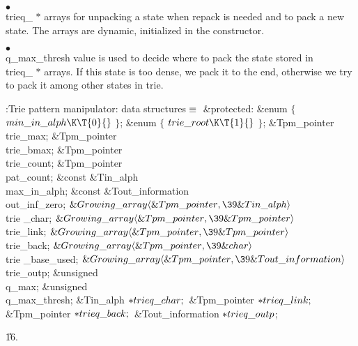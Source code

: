 \item{$\bullet$} \\{trieq\_} $*$ arrays for unpacking a state when repack is
needed and to pack a new state. The arrays are dynamic, initialized in
the constructor.

\item{$\bullet$} \\{q\_max\_thresh} value is used to decide where to pack the
state stored in \\{trieq\_} $*$ arrays. If this state is too dense, we pack it
to the end, otherwise we try to pack it among other states in trie.

\Y\B\4:Trie pattern manipulator: data structures\X${}\equiv{}$\6
\4\&{protected}:\6
\&{enum} ${}\{{}$\1\6
${}\\{min\_in\_alph}\K\T{0}{}$\2\6
${}\}{}$;\6
\&{enum} ${}\{{}$\1\6
${}\\{trie\_root}\K\T{1}{}$\2\6
${}\}{}$;\6
\&{Tpm\_pointer} \\{trie\_max};\6
\&{Tpm\_pointer} \\{trie\_bmax};\6
\&{Tpm\_pointer} \\{trie\_count};\6
\&{Tpm\_pointer} \\{pat\_count};\7
\&{const} \&{Tin\_alph} \\{max\_in\_alph};\6
\&{const} \&{Tout\_information} \\{out\_inf\_zero};\7
${}\&{Growing\_array}\langle\&{Tpm\_pointer},\39\&{Tin\_alph}\rangle{}$ \\{trie%
\_char};\6
${}\&{Growing\_array}\langle\&{Tpm\_pointer},\39\&{Tpm\_pointer}\rangle{}$ %
\\{trie\_link};\6
${}\&{Growing\_array}\langle\&{Tpm\_pointer},\39\&{Tpm\_pointer}\rangle{}$ %
\\{trie\_back};\6
${}\&{Growing\_array}\langle\&{Tpm\_pointer},\39\&{char}\rangle{}$ \\{trie%
\_base\_used};\6
${}\&{Growing\_array}\langle\&{Tpm\_pointer},\39\&{Tout\_information}\rangle{}$
\\{trie\_outp};\7
\&{unsigned} \\{q\_max};\6
\&{unsigned} \\{q\_max\_thresh};\6
\&{Tin\_alph} ${}{*}\\{trieq\_char};{}$\6
\&{Tpm\_pointer} ${}{*}\\{trieq\_link};{}$\6
\&{Tpm\_pointer} ${}{*}\\{trieq\_back};{}$\6
\&{Tout\_information} ${}{*}\\{trieq\_outp}{}$;\par
\U16.\fi

